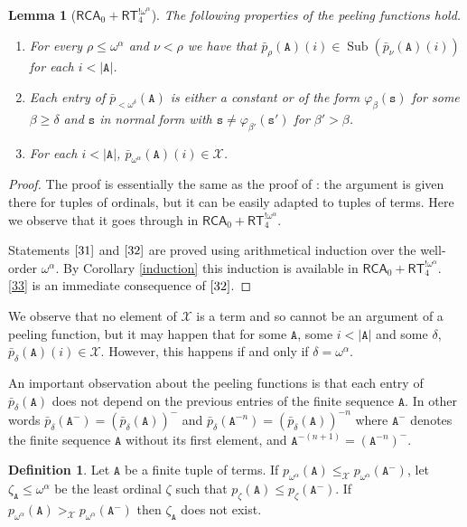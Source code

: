 \documentclass[11pt]{amsart}
\newtheorem{lemma}[thm]{Lemma}
\theoremstyle{definition}
\newtheorem{definition}[thm]{Definition}
\theoremstyle{remark}
\theoremstyle{plain}
\newcommand{\Sub}{\operatorname{Sub}}
\def\X{\mathcal{X}}
\def\om{\omega}
\def\a{\alpha}
\def\b{\beta}
\def\d{\delta}
\def\z{\zeta}
\def\pbar{\bar{p}}
\newcommand{\RCA}{\mathsf{RCA}_0}
\newcommand{\RT}{\mathsf{RT}}
\begin{document}
\begin{lemma}[$\RCA + \RT^{! \om^\a}_4$]\label{basic peeling}
The following properties of the peeling functions hold.
\begin{enumerate}
	\item \label{31} For every $\rho \le \om^\a$ and $\nu < \rho$ we have that $\pbar_\rho (\mathtt{A}) (i) \in \Sub(\pbar_\nu (\mathtt{A}) (i))$ for each $i < |\mathtt{A}|$.
	\item \label{32} Each entry of $\pbar_{<\om^\d}(\mathtt{A})$ is either a constant or of the form $\varphi_\b(\mathtt{s})$ for some $\b \ge \d$ and $\mathtt{s}$ in normal form with $\mathtt{s} \ne \varphi_{\b'}(\mathtt{s}')$ for $\b' > \b$.
	\item \label{33} For each $i < |\mathtt{A}|$, $\pbar_{\om^\a}(\mathtt{A})(i) \in \X$.
\end{enumerate}
\end{lemma}

\begin{proof}
The proof is essentially the same as the proof of \cite[Lemma 6.5]{marcone2025}: the argument is given there for tuples of ordinals, but it can be easily adapted to tuples of terms.
Here we observe that it goes through in $\RCA + \RT^{! \om^\a}_4$.

Statements $\ref{31}$ and $\ref{32}$ are proved using arithmetical induction over the well-order $\om^\a$.
By Corollary \ref{induction} this induction is available in $\RCA + \RT^{! \om^\a}_4$.
\ref{33} is an immediate consequence of $\ref{32}$.
\end{proof}

We observe that no element of $\X$ is a term and so cannot be an argument of a peeling function, but it may happen that for some $\mathtt{A}$, some $i < |\mathtt{A}|$ and some $\d$, $\pbar_\d(\mathtt{A})(i) \in \X$.
However, this happens if and only if $\d = \om^\a$.

An important observation about the peeling functions is that each entry of $\pbar_\d(\mathtt{A})$ does not depend on the previous entries of the finite sequence $\mathtt{A}$.
In other words $\pbar_\d (\mathtt{A}^-) = (\pbar_\d (\mathtt{A}))^-$ and $\pbar_\d (\mathtt{A}^{-n}) = (\pbar_\d (\mathtt{A}))^{-n}$ where $\mathtt{A}^-$ denotes the finite sequence $\mathtt{A}$ without its first element, and $\mathtt{A}^{-(n+1)} = (\mathtt{A}^{-n})^-$.

\begin{definition}
Let $\mathtt{A}$ be a finite tuple of terms.
If $p_{\om^\a}(\mathtt{A}) \le_\X p_{\om^\a}(\mathtt{A}^-)$, let $\z_\mathtt{A} \le \om^\a$ be the least ordinal $\z$ such that $p_\z(\mathtt{A}) \le p_\z(\mathtt{A}^-)$.
If $p_{\om^\a} (\mathtt{A}) >_\X p_{\om^\a} (\mathtt{A}^-)$ then $\z_\mathtt{A}$ does not exist.
\end{definition}
\end{document}
